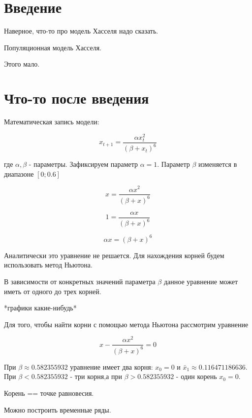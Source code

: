 \section{Введение}

    Наверное, что-то про модель Хасселя надо сказать.

    Популяционная модель Хасселя.

    Этого мало.

\section{Что-то после введения}

    Математическая запись модели:

    \[x_{t+1} = \frac{\alpha x_t^2}{(\beta + x_t)^6}\]

    где \(\alpha, \beta\) - параметры. Зафиксируем параметр \(\alpha = 1\). Параметр \(\beta\) изменяется в диапазоне \([0; 0.6]\)    

    \begin{equation}
        \label{eq1}
        x = \frac{\alpha x^2}{(\beta + x)^6}
    \end{equation}
    
    \[1 = \frac{\alpha x}{(\beta + x)^6}\]

    \[\alpha x = (\beta + x)^6\]

    Аналитически это уравнение не решается. Для нахождения корней будем использовать метод Ньютона.

    В зависимости от конкретных значений параметра \(\beta\) данное уравнение может иметь от одного до трех корней.
    
    *графики какие-нибудь*

    Для того, чтобы найти корни с помощью метода Ньютона рассмотрим уравнение 
    
    \[x - \frac{\alpha x^2}{(\beta + x)^6} = 0\]

    При \(\beta \approx 0.582355932\) уравнение имеет два корня: \(x_0 = 0\) и \(\bar{x}_1 \approx 0.116471186636\). При \(\beta < 0.582355932\) - три корня,а при \(\beta > 0.582355932\) - один корень \(x_0 = 0\).
    
    Корень == точке равновесия.

    Можно построить временные ряды.

